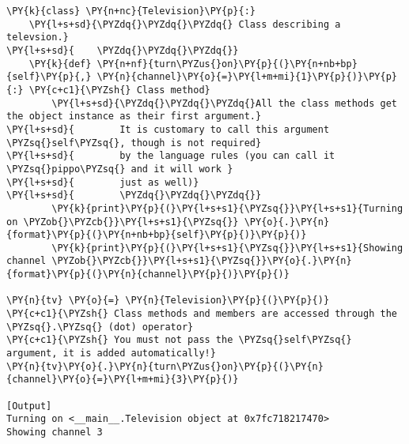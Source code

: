 \begin{Verbatim}[label=\makebox{\url{https://github.com/lucabaldini/cmepda/tree/master/slides/latex/snippets/class\_methods.py}},commandchars=\\\{\}]
\PY{k}{class} \PY{n+nc}{Television}\PY{p}{:}
    \PY{l+s+sd}{\PYZdq{}\PYZdq{}\PYZdq{} Class describing a televsion.}
\PY{l+s+sd}{    \PYZdq{}\PYZdq{}\PYZdq{}}
    \PY{k}{def} \PY{n+nf}{turn\PYZus{}on}\PY{p}{(}\PY{n+nb+bp}{self}\PY{p}{,} \PY{n}{channel}\PY{o}{=}\PY{l+m+mi}{1}\PY{p}{)}\PY{p}{:} \PY{c+c1}{\PYZsh{} Class method}
        \PY{l+s+sd}{\PYZdq{}\PYZdq{}\PYZdq{}All the class methods get the object instance as their first argument.}
\PY{l+s+sd}{        It is customary to call this argument \PYZsq{}self\PYZsq{}, though is not required}
\PY{l+s+sd}{        by the language rules (you can call it \PYZsq{}pippo\PYZsq{} and it will work }
\PY{l+s+sd}{        just as well)}
\PY{l+s+sd}{        \PYZdq{}\PYZdq{}\PYZdq{}}
        \PY{k}{print}\PY{p}{(}\PY{l+s+s1}{\PYZsq{}}\PY{l+s+s1}{Turning on \PYZob{}\PYZcb{}}\PY{l+s+s1}{\PYZsq{}} \PY{o}{.}\PY{n}{format}\PY{p}{(}\PY{n+nb+bp}{self}\PY{p}{)}\PY{p}{)}
        \PY{k}{print}\PY{p}{(}\PY{l+s+s1}{\PYZsq{}}\PY{l+s+s1}{Showing channel \PYZob{}\PYZcb{}}\PY{l+s+s1}{\PYZsq{}}\PY{o}{.}\PY{n}{format}\PY{p}{(}\PY{n}{channel}\PY{p}{)}\PY{p}{)}

\PY{n}{tv} \PY{o}{=} \PY{n}{Television}\PY{p}{(}\PY{p}{)}
\PY{c+c1}{\PYZsh{} Class methods and members are accessed through the \PYZsq{}.\PYZsq{} (dot) operator}
\PY{c+c1}{\PYZsh{} You must not pass the \PYZsq{}self\PYZsq{} argument, it is added automatically!}
\PY{n}{tv}\PY{o}{.}\PY{n}{turn\PYZus{}on}\PY{p}{(}\PY{n}{channel}\PY{o}{=}\PY{l+m+mi}{3}\PY{p}{)}

[Output]
Turning on <__main__.Television object at 0x7fc718217470>
Showing channel 3
\end{Verbatim}